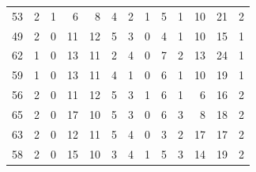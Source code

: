 \begin{table}[]
\begin{tabular}{rrrrrrrrrrrrr}
		53 & 2 & 1 & 6 & 8 & 4 & 2 & 1 & 5 & 1 & 10 & 21 & 2 \\
		49 & 2 & 0 & 11 & 12 & 5 & 3 & 0 & 4 & 1 & 10 & 15 & 1 \\
		62 & 1 & 0 & 13 & 11 & 2 & 4 & 0 & 7 & 2 & 13 & 24 & 1 \\
		59 & 1 & 0 & 13 & 11 & 4 & 1 & 0 & 6 & 1 & 10 & 19 & 1 \\
		56 & 2 & 0 & 11 & 12 & 5 & 3 & 1 & 6 & 1 & 6 & 16 & 2 \\
		65 & 2 & 0 & 17 & 10 & 5 & 3 & 0 & 6 & 3 & 8 & 18 & 2 \\
		63 & 2 & 0 & 12 & 11 & 5 & 4 & 0 & 3 & 2 & 17 & 17 & 2 \\
		58 & 2 & 0 & 15 & 10 & 3 & 4 & 1 & 5 & 3 & 14 & 19 & 2
	\end{tabular}
\end{table}